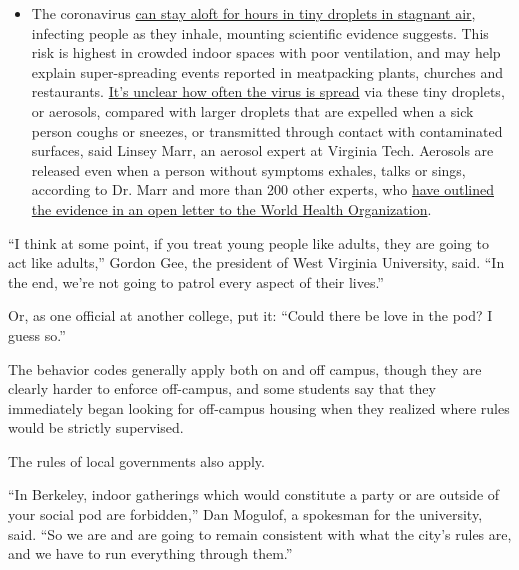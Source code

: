 \begin{itemize}
  \begin{itemize}
  \tightlist
  \item
    The coronavirus
    \href{https://www.nytimes.com/2020/07/04/health/239-experts-with-one-big-claim-the-coronavirus-is-airborne.html?action=click\&pgtype=Article\&state=default\&region=MAIN_CONTENT_3\&context=storylines_faq}{can
    stay aloft for hours in tiny droplets in stagnant air}, infecting
    people as they inhale, mounting scientific evidence suggests. This
    risk is highest in crowded indoor spaces with poor ventilation, and
    may help explain super-spreading events reported in meatpacking
    plants, churches and restaurants.
    \href{https://www.nytimes.com/2020/07/06/health/coronavirus-airborne-aerosols.html?action=click\&pgtype=Article\&state=default\&region=MAIN_CONTENT_3\&context=storylines_faq}{It's
    unclear how often the virus is spread} via these tiny droplets, or
    aerosols, compared with larger droplets that are expelled when a
    sick person coughs or sneezes, or transmitted through contact with
    contaminated surfaces, said Linsey Marr, an aerosol expert at
    Virginia Tech. Aerosols are released even when a person without
    symptoms exhales, talks or sings, according to Dr. Marr and more
    than 200 other experts, who
    \href{https://academic.oup.com/cid/article/doi/10.1093/cid/ciaa939/5867798}{have
    outlined the evidence in an open letter to the World Health
    Organization}.
  \end{itemize}
\end{itemize}

``I think at some point, if you treat young people like adults, they are
going to act like adults,'' Gordon Gee, the president of West Virginia
University, said. ``In the end, we're not going to patrol every aspect
of their lives.''

Or, as one official at another college, put it: ``Could there be love in
the pod? I guess so.''

The behavior codes generally apply both on and off campus, though they
are clearly harder to enforce off-campus, and some students say that
they immediately began looking for off-campus housing when they realized
where rules would be strictly supervised.

The rules of local governments also apply.

``In Berkeley, indoor gatherings which would constitute a party or are
outside of your social pod are forbidden,'' Dan Mogulof, a spokesman for
the university, said. ``So we are and are going to remain consistent
with what the city's rules are, and we have to run everything through
them.''

